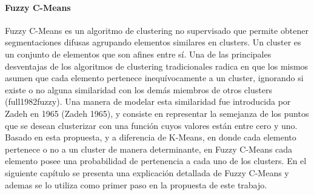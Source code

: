 \paragraph{Fuzzy C-Means}
Fuzzy C-Means es un algoritmo de clustering no supervisado que permite obtener segmentaciones difusas agrupando elementos similares en clusters. Un cluster es un conjunto de elementos que son afines entre sí. Una de las principales desventajas de los algoritmos de clustering tradicionales radica en que los mismos asumen que cada elemento pertenece inequívocamente a un cluster, ignorando si existe o no alguna similaridad con los demás miembros de otros clusters (full1982fuzzy). Una manera de modelar esta similaridad fue introducida por Zadeh en 1965 (Zadeh 1965), y consiste en representar la semejanza de los puntos que se desean clusterizar con una función cuyos valores están entre cero y uno. Basado en esta propuesta, y a diferencia de K-Means, en donde cada elemento pertenece o no a un cluster de manera determinante, en Fuzzy C-Means cada elemento posee una probabilidad de pertenencia a cada uno de los clusters.
En el siguiente capítulo se presenta una explicación detallada de Fuzzy C-Means y ademas se lo utiliza como primer paso en la propuesta de este trabajo.
